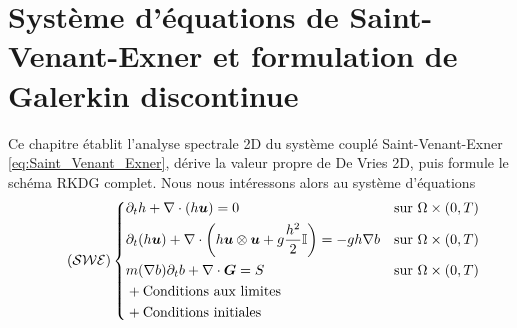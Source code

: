 \documentclass[11pt, a4paper, oneside]{report}
\begin{document}
\chapter{Système d'équations de Saint-Venant-Exner et formulation de Galerkin discontinue}

Ce chapitre établit l'analyse spectrale 2D du système couplé Saint-Venant-Exner \eqref{eq:Saint_Venant_Exner}, dérive la valeur propre de De Vries 2D, puis formule le schéma RKDG complet.
Nous nous intéressons alors au système d'équations
\begin{equation} \tag{$\mathcal{SWE}$} \label{eq:Saint_Venant_Exner}
    \left \{
    \begin{aligned}
        & \partial_t h + \nabla \cdot \left( h \bm{u} \right) = 0 && \text{sur } \Omega \times (0, T) \\
        & \partial_t (h \bm{u}) + \nabla \cdot \left( h \bm{u} \otimes \bm{u} + g \frac{h^2}{2} \mathbb{I} \right) = - g h \nabla b && \text{sur } \Omega \times (0, T) \\
        & m(\nabla b) \partial_t b + \nabla \cdot \bm{G} = S && \text{sur } \Omega \times (0, T) \\
        & + \text{Conditions aux limites} \\
        & + \text{Conditions initiales}
    \end{aligned}
    \right .
\end{equation}
\end{document}
